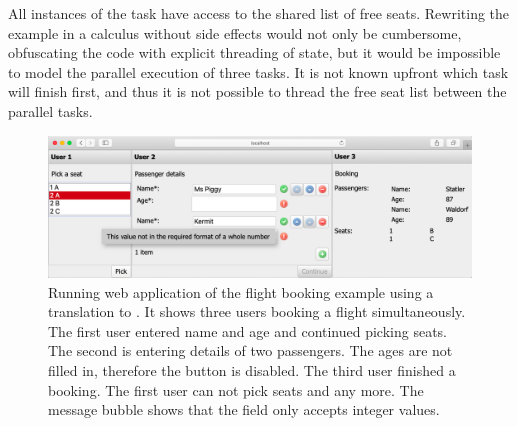 \begin{example}
All instances of the  task have access to the shared list of free seats.
Rewriting the example in a calculus without side effects would not only be cumbersome,
obfuscating the code with explicit threading of state,
but it would be impossible to model the parallel execution of three  tasks.
It is not known upfront which task will finish first,
and thus it is not possible to thread the free seat list between the parallel tasks.

\end{example}



\begin{figure}[h]
  \includegraphics[width=0.8\columnwidth]{figures/flight-booking.png}
  \caption{
    Running web application of the flight booking example using a translation to \ITASKS.
    It shows three users booking a flight simultaneously.
    The first user entered name and age and continued picking seats.
    The second is entering details of two passengers.
    The ages are not filled in, therefore the  button is disabled.
    The third user finished a booking.
    The first user can not pick seats  and  any more.
    The message bubble shows that the  field only accepts integer values.
  }
  \label{fig:flight-booking}
\end{figure}
